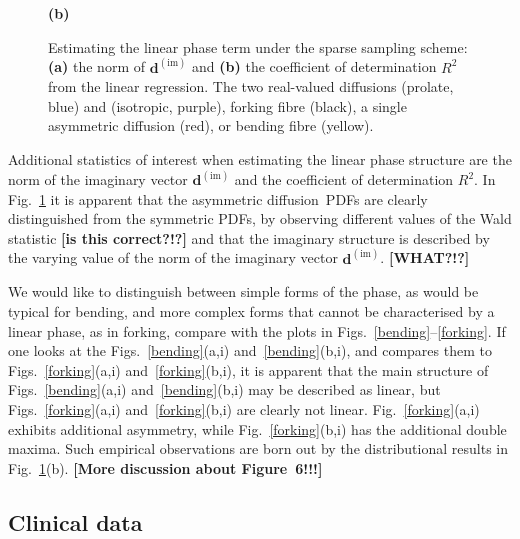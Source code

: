 \documentclass[authoryear,preprint,12pt]{elsarticle}
\newcommand{\im}{\text{im}}
\newcommand{\bd}{\mathbf{d}}
\begin{document}
\begin{figure}[tbp]
\begin{center}
\begin{minipage}[]{0.45\textwidth}
      \textbf{(b)}
    \end{minipage}
  \end{center}
  \caption{Estimating the linear phase term under the sparse sampling
    scheme: \textbf{(a)} the norm of $\bd^{(\im)}$ and \textbf{(b)}
    the coefficient of determination $R^2$ from the linear regression.
    The two real-valued diffusions (prolate, blue) and (isotropic,
    purple), forking fibre (black), a single asymmetric diffusion
    (red), or bending fibre (yellow).}
  \label{fig-1} 
\end{figure}

Additional statistics of interest when estimating the linear phase
structure are the norm of the imaginary vector $\bd^{(\im)}$ and the
coefficient of determination $R^2$.  In Fig.~\ref{fig-1} it is
apparent that the asymmetric diffusion~PDFs are clearly distinguished
from the symmetric PDFs, by observing different values of the Wald
statistic \textbf{[is this correct?!?]} and that the imaginary
structure is described by the varying value of the norm of the
imaginary vector $\bd^{(\im)}$.  \textbf{[WHAT?!?]}

We would like to distinguish between simple forms of the phase, as
would be typical for bending, and more complex forms that cannot be
characterised by a linear phase, as in forking, compare with the plots
in Figs.~\ref{bending}--\ref{forking}.  If one looks at the
Figs.~\ref{bending}(a,i) and~\ref{bending}(b,i), and compares them to
Figs.~\ref{forking}(a,i) and~\ref{forking}(b,i), it is apparent that
the main structure of Figs.~\ref{bending}(a,i) and~\ref{bending}(b,i)
may be described as linear, but Figs.~\ref{forking}(a,i)
and~\ref{forking}(b,i) are clearly not linear.
Fig.~\ref{forking}(a,i) exhibits additional asymmetry, while
Fig.~\ref{forking}(b,i) has the additional double maxima.  Such
empirical observations are born out by the distributional results in
Fig.~\ref{fig-1}(b).  \textbf{[More discussion about Figure~6!!!]}

\subsection{Clinical data}
\end{document}
